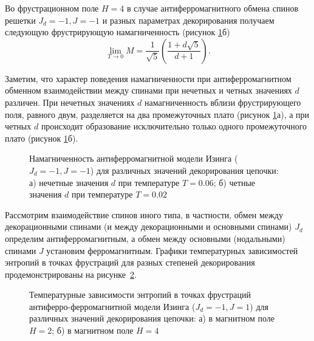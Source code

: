 Во фрустрационном поле $H=4$ в случае антиферромагнитного обмена спинов решетки \mbox{$J_d=-1, J=-1$} и разных параметрах декорирования получаем следующую фрустрирующую намагниченность (рисунок \ref{magDecor}б)
\begin{equation}
\lim_{T \rightarrow 0} M = \frac{1}{\sqrt{5}}\left(\frac{1+d\sqrt{5}}{d+1}\right).
\label{26d}
\end{equation}

Заметим, что характер поведения намагниченности при антиферромагнитном обменном взаимодействии между спинами при нечетных и четных значениях $d$ различен. При нечетных значениях $d$ намагниченность вблизи фрустрирующего поля, равного двум, разделяется на два промежуточных плато (рисунок \ref{magDecor}а), а при четных $d$ происходит образование исключительно только одного промежуточного плато (рисунок \ref{magDecor}б).

 \begin{figure}[h]
 	\begin{minipage}{0.49\linewidth}
 	\end{minipage}
 	\hfill
 	\begin{minipage}{0.49\linewidth}
 	\end{minipage}
 	\caption{Намагниченность антиферромагнитной модели Изинга ($J_d=-1, J=-1$) для различных значений декорирования цепочки:  а) нечетные значения $d$ при температуре $T=0.06$;  б) четные значения $d$ при температуре $T=0.02$}
 	\label{magDecor}
 \end{figure}

Рассмотрим взаимодействие спинов иного типа, в частности, обмен между декорационными спинами (и между декорационными и основными спинами) $J_d$ определим антиферромагнитным, а обмен между основными (нодальными) спинами $J$ установим ферромагнитным. Графики температурных зависимостей энтропий в точках фрустраций для разных степеней декорирования продемонстрированы на рисунке~\ref{entropyDecor2}.

 \begin{figure}[h]
 	\begin{minipage}{0.49\linewidth}
 	\end{minipage}
 	\hfill
 	\begin{minipage}{0.49\linewidth}
 	\end{minipage}
 	\caption{Температурные зависимости энтропий в точках фрустраций антиферро-ферромагнитной модели Изинга ($J_d=-1, J=1$) для различных значений декорирования цепочки: а) в магнитном поле $H=2$;  б) в магнитном поле $H=4$}
 	\label{entropyDecor2}
 \end{figure}

